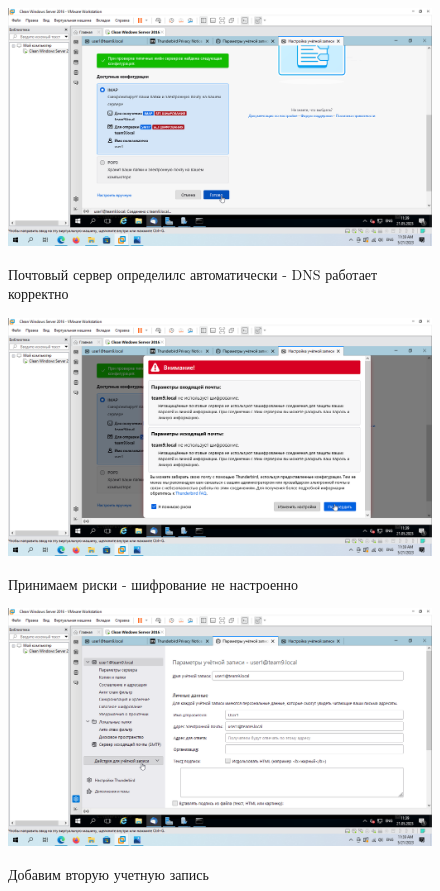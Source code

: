 \documentclass[a4paper]{article}
\begin{document}
  \begin{figure}[H]
    \centering
    \includegraphics[width=\textwidth]{11_0143}
    \label{img:143}
    \caption{Почтовый сервер определилс автоматически - DNS работает корректно}
  \end{figure}

  \begin{figure}[H]
    \centering
    \includegraphics[width=\textwidth]{11_0144}
    \label{img:144}
    \caption{Принимаем риски - шифрование не настроенно}
  \end{figure}

  \begin{figure}[H]
    \centering
    \includegraphics[width=\textwidth]{11_0145}
    \label{img:145}
    \caption{Добавим вторую учетную запись}
  \end{figure}
\end{document}
